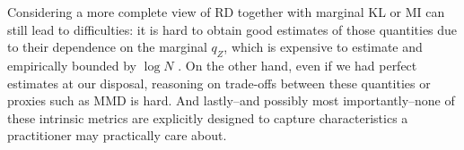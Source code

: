 %
Considering a more complete view of RD together with marginal KL or MI can still lead to difficulties: it is hard to obtain good estimates of those quantities  due to their dependence on the marginal $q_Z$, which is expensive to estimate and empirically bounded by $\log N$ \citep{Song2020Understanding}. %
On the other hand, even if we had perfect estimates at our disposal, reasoning on trade-offs between these quantities or proxies such as MMD is hard. And lastly--and possibly most importantly--none of these intrinsic metrics are explicitly designed to capture characteristics a practitioner may practically care about.

